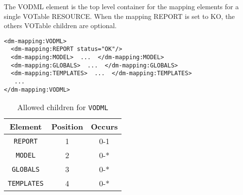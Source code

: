 The VODML element is the top level container for the mapping elements for a single VOTable RESOURCE.
When the mapping REPORT is set to KO, the others  VOTable children are optional.

\begin{lstlisting}[frame=single,caption={Example VODML mapping block},style=XML,basicstyle=\tiny]
<dm-mapping:VODML>
  <dm-mapping:REPORT status="OK"/>
  <dm-mapping:MODEL>  ...  </dm-mapping:MODEL>
  <dm-mapping:GLOBALS>  ...  </dm-mapping:GLOBALS>
  <dm-mapping:TEMPLATES>  ...  </dm-mapping:TEMPLATES>
   ...
</dm-mapping:VODML>
\end{lstlisting}

\begin{table}[!htbp]
  \small
  \centering
  \begin{tabulary}{\linewidth}{|c |c |c|}
    \hline 
        \textbf{Element} &
        \textbf{Position} &
        \textbf{Occurs}\\
    \hline
    \hline  
      \texttt{REPORT} &           
      1 &           
      0-1\\
    \hline  
      \texttt{MODEL} &           
      2 &           
      0-*\\
    \hline    
      \texttt{GLOBALS} &           
      3 &           
      0-*\\
    \hline  
      \texttt{TEMPLATES} &           
      4 &           
      0-*\\
    \hline 
  \end{tabulary}
    \caption{Allowed children for \texttt{VODML}} 
    \label{tbl:vodml-children}
\end{table}


